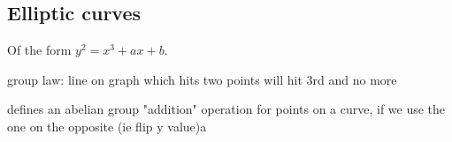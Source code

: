 
\subsection{Elliptic curves}

Of the form \(y^2=x^3+ax+b\).

group law: line on graph which hits two points will hit 3rd and no more

defines an abelian group "addition" operation for points on a curve, if we use the one on the opposite (ie flip y value)a

